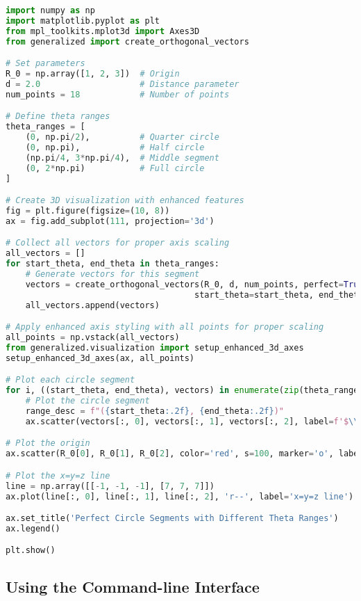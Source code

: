 \begin{lstlisting}[language=Python]
import numpy as np
import matplotlib.pyplot as plt
from mpl_toolkits.mplot3d import Axes3D
from generalized import create_orthogonal_vectors

# Set parameters
R_0 = np.array([1, 2, 3])  # Origin
d = 2.0                    # Distance parameter
num_points = 18            # Number of points

# Define theta ranges
theta_ranges = [
    (0, np.pi/2),          # Quarter circle
    (0, np.pi),            # Half circle
    (np.pi/4, 3*np.pi/4),  # Middle segment
    (0, 2*np.pi)           # Full circle
]

# Create 3D visualization with enhanced features
fig = plt.figure(figsize=(10, 8))
ax = fig.add_subplot(111, projection='3d')

# Collect all vectors for proper axis scaling
all_vectors = []
for start_theta, end_theta in theta_ranges:
    # Generate vectors for this segment
    vectors = create_orthogonal_vectors(R_0, d, num_points, perfect=True, 
                                      start_theta=start_theta, end_theta=end_theta)
    all_vectors.append(vectors)

# Apply enhanced axis styling with all points for proper scaling
all_points = np.vstack(all_vectors)
from generalized.visualization import setup_enhanced_3d_axes
setup_enhanced_3d_axes(ax, all_points)

# Plot each circle segment
for i, ((start_theta, end_theta), vectors) in enumerate(zip(theta_ranges, all_vectors)):
    # Plot the circle segment
    range_desc = f"({start_theta:.2f}, {end_theta:.2f})"
    ax.scatter(vectors[:, 0], vectors[:, 1], vectors[:, 2], label=f'$\\theta \\in$ {range_desc}')

# Plot the origin
ax.scatter(R_0[0], R_0[1], R_0[2], color='red', s=100, marker='o', label='Origin R_0')

# Plot the x=y=z line
line = np.array([[-1, -1, -1], [7, 7, 7]])
ax.plot(line[:, 0], line[:, 1], line[:, 2], 'r--', label='x=y=z line')

ax.set_title('Perfect Circle Segments with Different Theta Ranges')
ax.legend()

plt.show()
\end{lstlisting}

\subsection{Using the Command-line Interface}

